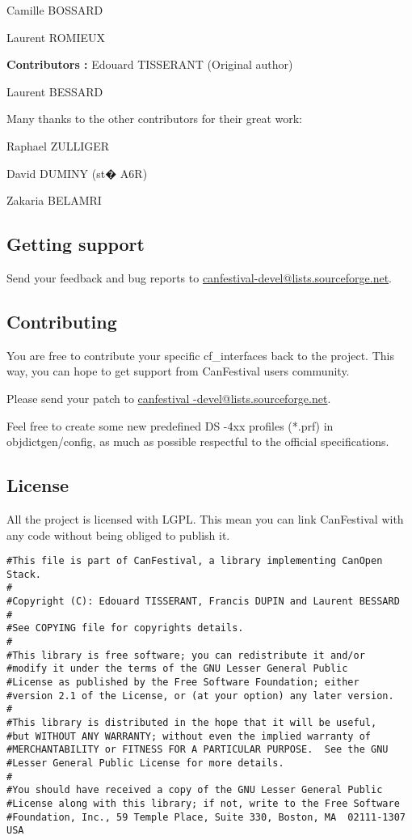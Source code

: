 \documentclass[12pt,english,a4paper]{book}
\begin{document}
Camille BOSSARD

Laurent ROMIEUX

\bigskip{}

\textbf{Contributors :} Edouard TISSERANT (Original author)

Laurent BESSARD

\bigskip{}


Many thanks to the other contributors for their great work:

Raphael ZULLIGER

David DUMINY (st� A6R)

Zakaria BELAMRI


\subsection{Getting support}

Send your feedback and bug reports to \href{mailto:canfestival-devel@lists.sourceforge.net}{canfestival-devel@lists.sourceforge.net}.

\subsection{Contributing}

You are free to contribute your specific cf_interfaces back to the project.
This way, you can hope to get support from CanFestival users community.

Please send your patch to \href{mailto:canfestival-devel@lists.sourceforge.net}{canfestival
-devel@lists.sourceforge.net}.

Feel free to create some new predefined DS -4xx profiles ({*}.prf)
in objdictgen/config, as much as possible respectful to the official
specifications.


\subsection{License}

All the project is licensed with LGPL. This mean you can link CanFestival
with any code without being obliged to publish it.


\begin{verbatim}
#This file is part of CanFestival, a library implementing CanOpen Stack. 
# 
#Copyright (C): Edouard TISSERANT, Francis DUPIN and Laurent BESSARD 
# 
#See COPYING file for copyrights details. 
# 
#This library is free software; you can redistribute it and/or 
#modify it under the terms of the GNU Lesser General Public 
#License as published by the Free Software Foundation; either 
#version 2.1 of the License, or (at your option) any later version. 
# 
#This library is distributed in the hope that it will be useful, 
#but WITHOUT ANY WARRANTY; without even the implied warranty of 
#MERCHANTABILITY or FITNESS FOR A PARTICULAR PURPOSE.  See the GNU 
#Lesser General Public License for more details. 
# 
#You should have received a copy of the GNU Lesser General Public 
#License along with this library; if not, write to the Free Software 
#Foundation, Inc., 59 Temple Place, Suite 330, Boston, MA  02111-1307  USA 
\end{verbatim}
\end{document}
